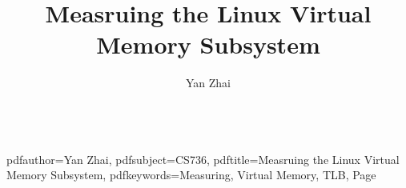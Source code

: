 \documentclass{sig-alternate}
\begin{document}
\hypersetup
{
    pdfauthor={Yan Zhai},
    pdfsubject={CS736},
    pdftitle={Measruing the Linux Virtual Memory Subsystem},
    pdfkeywords={Measuring, Virtual Memory, TLB, Page}
}

\title{Measruing the Linux Virtual Memory Subsystem}

\author{
    \alignauthor Yan Zhai\\
        \\
}

\maketitle












\end{document}
